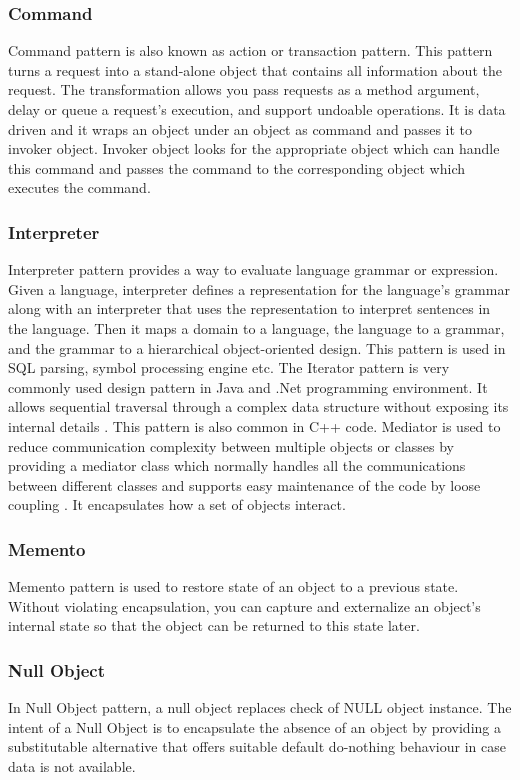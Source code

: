 \documentclass[sigplan,12pt,nonacm=true,review=false]{acmart}
\begin{document}
\subsubsection{Command}
Command pattern is also known as action or transaction pattern. This pattern turns a request into a stand-alone object that contains all information about the request. The transformation allows you pass requests as a method argument, delay or queue a request’s execution, and support undoable operations. It is data driven and it wraps an object under an object as command \cite{wendorff_assessment_2001} and passes it to invoker object. Invoker object looks for the appropriate object which can handle this command and passes the command to the corresponding object which executes the command.

\subsubsection{Interpreter}
Interpreter pattern provides a way to evaluate language grammar or expression. Given a language, interpreter defines a representation for the language’s grammar along with an interpreter that uses the representation to interpret sentences in the language. Then it maps a domain to a language, the language to a grammar, and the grammar to a hierarchical object-oriented design. This pattern is used in SQL parsing, symbol processing engine etc. 
The Iterator pattern is very commonly used design pattern in Java and .Net programming environment. It allows sequential traversal through a complex data structure without exposing its internal details \cite{tichy_catalogue_1997}. This pattern is also common in C++ code. Mediator is used to reduce communication complexity between multiple objects or classes by providing a mediator class which normally handles all the communications between different classes and supports easy maintenance of the code by loose coupling \cite{tichy_catalogue_1997}. It encapsulates how a set of objects interact.

\subsubsection{Memento}
Memento pattern is used to restore state of an object to a previous state. Without violating encapsulation, you can capture and externalize an object's internal state so that the object can be returned to this state later. 

\subsubsection{Null Object}
In Null Object pattern, a null object replaces check of NULL object instance. The intent of a Null Object is to encapsulate the absence of an object by providing a substitutable alternative that offers suitable default do-nothing behaviour in case data is not available.
\end{document}
